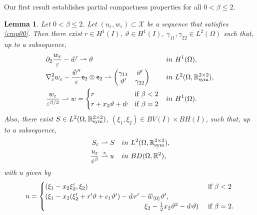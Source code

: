 \documentclass[a4, 11pt, reqno, final]{amsart}
\newcommand{\calX}{\mathcal{X}}
\newcommand{\bbR}{\mathbb{R}}
\newcommand\e{\varepsilon}
\newcommand\weakstar{\stackrel{\ast }{\rightharpoonup}}  %
\newcommand\weak{\rightharpoonup} %
\newcommand\ringring[1]{%
	{%
		\mathop{\kern0pt #1}\limits^{%
			\vbox to-1.85ex{
				\kern-2ex %
				\hbox to 0pt{\hss\normalfont\kern.1em \r{}\kern-.45em \r{}\hss}%
				\vss %
			}%
		}%
	}%
}
\theoremstyle{plain}%
\newtheorem{lemma}[theorem]{Lemma}
\DeclareMathOperator{\Sym}{\bbR^{2\times 2}_{\rm sym}}
\begin{document}
	Our first result establishes partial compactness properties for  all  $0<\beta\le 2$.

	\begin{lemma}\label{compactness4}
		Let $0< \beta \le 2$.
		Let $(u_\e, w_{\e})\subset \calX$ be a sequence that satisfies \eqref{cmp00}.
		Then there exist $r \in H^1(I)$, $\vartheta \in H^1(I)$,   $\gamma_{11}, \gamma_{22}\in L^2(\Omega)$
		such that, up to a subsequence,
		\begin{align}
			&\partial_{2} \frac{w_\e}{\e} - \mathring{w} ' \weak \vartheta &&in \ H^1(\Omega), \label{cmp1}\\
			&\nabla^2_\e w_\e - \frac{\mathring{w} ''}{\e}\mathsf{e}_2\otimes \mathsf{e}_2 \weak
			\begin{pmatrix}
				\gamma_{11} &  \vartheta'
				\\
				\vartheta' & \gamma_{22}
			\end{pmatrix}
			&& in \ L^{2}(\Omega, \Sym), \label{cmp2}\\
			&\frac{w_\e}{\e^{\beta/2}} \weak w=\begin{cases}
				r & \text{if }\beta <2\\
				r+x_2\vartheta+\mathring{w} & \text{if }\beta =2
			\end{cases}  &&in \ H^1(\Omega).\label{cmp3}
		\end{align}
		Also, there exist $S \in L^2(\Omega,\mathbb{R}^{2\times 2}_{\rm sym})$, $(\xi_1, \xi_2) \in BV(I)\times BH(I)$,  such that, up to a subsequence,
		\begin{align}
			S_\e &\weak S&& in \ L^{2}(\Omega, \Sym), \label{cmp5}\\
			\frac{u_{\e}}{\e^\beta} &\weakstar u &&in \ BD(\Omega, \bbR^2),\label{cmp6}
		\end{align}
		with $u$ given by
		\begin{equation}\label{cmp7}
			u = \begin{cases}
				(\xi_1 - x_2 \xi_2', \xi_2) & \text{ if } \beta < 2\\
				(\xi_1 -x_2(\xi_2'+r'\vartheta + c_1\vartheta') - \mathring{w} r'   -\ringring{w}_{\langle 0 \rangle}\vartheta',\\
				\hspace{5cm}		\xi_2 - \frac12 x_2 \vartheta^2 - \mathring{w}\vartheta) & \text{ if } \beta = 2.
			\end{cases}
		\end{equation}
	\end{lemma}
\end{document}
